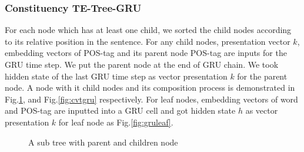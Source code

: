 \subsubsection{Constituency TE-Tree-GRU} \label{sec:VTtreeConstituency}
For each node which has at least one child, we sorted the child nodes according to its relative position in the sentence.
For any child nodes, presentation vector \(k\), embedding vectors of POS-tag and its parent node POS-tag are inputs for the GRU time step.
We put the parent node at the end of GRU chain. We took hidden state of the last GRU time step as vector presentation \(k\) for the parent node.
A node with it child nodes and its composition process is demonstrated in Fig.\ref{fig:treecp}, and Fig.\ref{fig:cvtgru} respectively.
For leaf nodes, embedding vectors of word and POS-tag are inputted into a GRU cell and got hidden state \(h\) as vector presentation \(k\) for leaf node as Fig.\ref{fig:gruleaf}.
\begin{figure}[H]
    \centering
    \caption[A sub tree with parent and children node]{A sub tree with parent and children node}
    \label{fig:treecp}
\end{figure}

